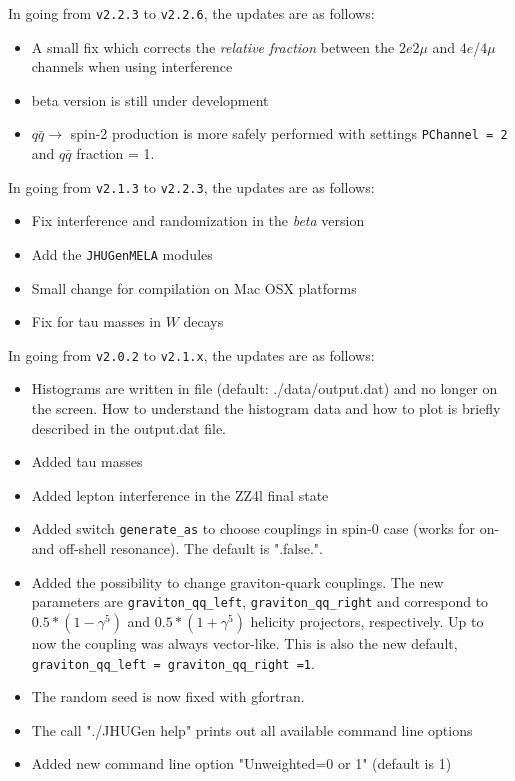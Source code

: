 \documentclass[aps,superscriptaddress,nofootinbib]{revtex4}
\begin{document}
\noindent
In going from \verb|v2.2.3| to \verb|v2.2.6|, the updates are as follows:
\begin{itemize}
\item A small fix which corrects the {\it relative fraction} between the $2e2\mu$ and $4e$/$4\mu$ channels when using interference
\item beta version is still under development
\item $q\bar{q} \to$ spin-2 production is more safely performed with settings \verb|PChannel = 2| and $q\bar{q}$ fraction = 1.
\end{itemize}

\noindent
In going from \verb|v2.1.3| to \verb|v2.2.3|, the updates are as follows:
\begin{itemize}
\item Fix interference and randomization in the {\it{beta}} version
\item Add the \verb|JHUGenMELA| modules
\item Small change for compilation on Mac OSX platforms
\item Fix for tau masses in $W$ decays
\end{itemize}

\noindent
In going from \verb|v2.0.2| to \verb|v2.1.x|, the updates are as follows:

\begin{itemize}
\item Histograms are written in file (default: ./data/output.dat) and no longer on the screen.  How to understand the histogram data and how to plot is briefly described in the output.dat file.
\item Added tau masses
\item Added lepton interference in the ZZ4l final state
\item Added switch \verb|generate_as| to choose couplings in spin-0 case (works for on- and off-shell resonance). The default is ".false.".
\item Added the possibility to change graviton-quark couplings. The new parameters are \verb|graviton_qq_left|, \verb|graviton_qq_right| and correspond to $0.5*(1-\gamma^5)$ and $0.5*(1+\gamma^5)$ helicity projectors, respectively. Up to now the coupling was always vector-like. This is also the new default, \verb|graviton_qq_left = graviton_qq_right =1|.
\item The random seed is now fixed with gfortran.
\item The call "./JHUGen help" prints out all available command line options
\item Added new command line option "Unweighted=0 or 1" (default is 1)
\end{itemize}
\end{document}

